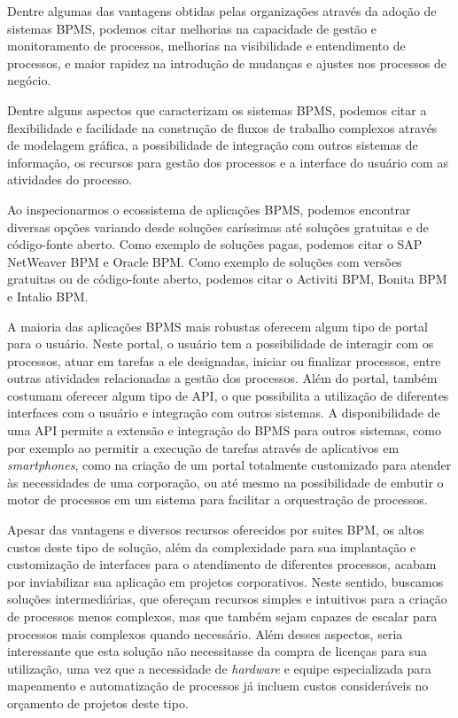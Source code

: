 Dentre algumas das vantagens obtidas pelas organizações através da adoção de sistemas BPMS, podemos citar melhorias na capacidade de gestão e monitoramento de processos, melhorias na visibilidade e entendimento de processos, e maior rapidez na introdução de mudanças e ajustes nos processos de negócio.

Dentre alguns aspectos que caracterizam os sistemas BPMS, podemos citar a flexibilidade e facilidade na construção de fluxos de trabalho complexos através de modelagem gráfica, a possibilidade de integração com outros sistemas de informação, os recursos para gestão dos processos e a interface do usuário com as atividades do processo.

Ao inspecionarmos o ecossistema de aplicações BPMS, podemos encontrar diversas opções variando desde soluções caríssimas até soluções gratuitas e de código-fonte aberto. Como exemplo de soluções pagas, podemos citar o SAP NetWeaver BPM\cite{bpm_sap} e Oracle BPM\cite{bpm_oracle}. Como exemplo de soluções com versões gratuitas ou de código-fonte aberto, podemos citar o Activiti BPM\cite{bpm_activiti}, Bonita BPM\cite{bpm_bonita} e Intalio BPM\cite{bpm_intalio}.

A maioria das aplicações BPMS mais robustas oferecem algum tipo de portal para o usuário. Neste portal, o usuário tem a possibilidade de interagir com os processos, atuar em tarefas a ele designadas, iniciar ou finalizar processos, entre outras atividades relacionadas a gestão dos processos. Além do portal, também costumam oferecer algum tipo de API, o que possibilita a utilização de diferentes interfaces com o usuário e integração com outros sistemas. A disponibilidade de uma API permite a extensão e integração do BPMS para outros sistemas, como por exemplo ao permitir a execução de tarefas através de aplicativos em \textit{smartphones}, como na criação de um portal totalmente customizado para atender às necessidades de uma corporação, ou até mesmo na possibilidade de embutir o motor de processos em um sistema para facilitar a orquestração de processos.

Apesar das vantagens e diversos recursos oferecidos por suites BPM, os altos custos deste tipo de solução, além da complexidade para sua implantação e customização de interfaces para o atendimento de diferentes processos, acabam por inviabilizar sua aplicação em projetos corporativos. Neste sentido, buscamos soluções intermediárias, que ofereçam recursos simples e intuitivos para a criação de processos menos complexos, mas que também sejam capazes de escalar para processos mais complexos quando necessário. Além desses aspectos, seria interessante que esta solução não necessitasse da compra de licenças para sua utilização, uma vez que a necessidade de \textit{hardware} e equipe especializada para mapeamento e automatização de processos já incluem custos consideráveis no orçamento de projetos deste tipo.


